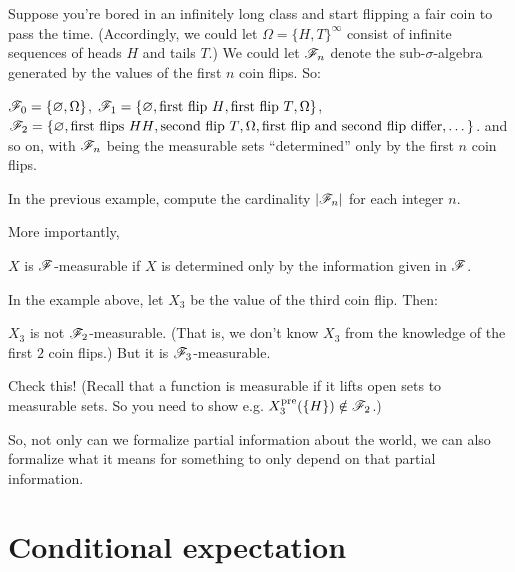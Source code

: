 \begin{example}
	[Filtration]
	Suppose you're bored in an infinitely long class
	and start flipping a fair coin to pass the time.
	(Accordingly, we could let $\Omega = \{H,T\}^\infty$
	consist of infinite sequences of heads $H$ and tails $T$.)
	We could let $\mathscr F_n$ denote the sub-$\sigma$-algebra
	generated by the values of the first $n$ coin flips.
	So:
	\begin{itemize}
		\ii $\mathscr F_0 = \{\varnothing, \Omega\}$,
		\ii $\mathscr F_1 = \{\varnothing, \text{first flip $H$}, \text{first flip $T$}, \Omega\}$,
		\ii $\mathscr F_2 = \{\varnothing, \text{first flips $HH$}, \text{second flip $T$}, \Omega, \text{first flip and second flip differ}, \dots\}$.
		\ii and so on, with $\mathscr F_n$ being the measurable sets
		``determined'' only by the first $n$ coin flips.
	\end{itemize}
\end{example}

\begin{exercise}
	In the previous example, compute the cardinality $|\mathscr F_n|$ for each integer $n$.
\end{exercise}

More importantly,
\begin{moral}
	$X$ is $\mathscr F$-measurable if $X$ is determined only by the information given in $\mathscr F$.
\end{moral}
\begin{example}
	In the example above, let $X_3$ be the value of the third coin flip. Then:
	\begin{itemize}
		\ii $X_3$ is not $\mathscr F_2$-measurable. (That is, we don't know $X_3$ from the knowledge of the
		first $2$ coin flips.)
		\ii But it is $\mathscr F_3$-measurable.
	\end{itemize}
\end{example}
\begin{exercise}
	Check this! (Recall that a function is measurable if it lifts open sets to measurable sets.
	So you need to show e.g. $X_3^{\text{pre}}(\{H\}) \notin \mathscr F_2$.)
\end{exercise}
So, not only can we formalize partial information about the world, we can also formalize what it
means for something to only depend on that partial information.

\section{Conditional expectation}

